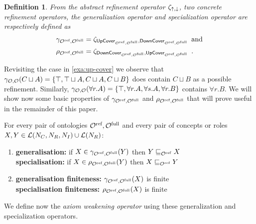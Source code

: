 \documentclass[
]{ceurart}
\newtheorem{definition}{Definition}
\begin{document}
\begin{definition}
  From the abstract refinement operator $\zeta_{\mathop{\uparrow},\mathop{\downarrow}}$, two concrete refinement operators, the \emph{generalization operator} and \emph{specialization operator} are respectively defined as
  \begin{align*}
    \gamma_{{\mathcal{O}^\textnormal{ref}},{\mathcal{O}^\textnormal{full}}} &= \zeta_{{\mathsf{UpCover}}_{{\mathcal{O}^\textnormal{ref}},{\mathcal{O}^\textnormal{full}}},{\mathsf{DownCover}}_{{\mathcal{O}^\textnormal{ref}},{\mathcal{O}^\textnormal{full}}}} \enspace \text{and} \\
    \rho_{{\mathcal{O}^\textnormal{ref}},{\mathcal{O}^\textnormal{full}}} &= \zeta_{{\mathsf{DownCover}}_{{\mathcal{O}^\textnormal{ref}},{\mathcal{O}^\textnormal{full}}},{\mathsf{UpCover}}_{{\mathcal{O}^\textnormal{ref}},{\mathcal{O}^\textnormal{full}}}} \enspace.
  \end{align*}
\end{definition}

Revisiting the case in \cref{exa:up-cover} we observe that $\gamma_{\mathcal{O},\mathcal{O}}(C \sqcup A) = \{ \top, \top \sqcup A, C \sqcup A, C \sqcup B \}$ does contain $C \sqcup B$ as a possible refinement. Similarly, $\gamma_{\mathcal{O},\mathcal{O}}(\forall r.A) = \{ \top, \forall r.A, \forall s.A, \forall r.B \}$ contains $\forall r.B$. We will show now some basic properties of $\gamma_{{\mathcal{O}^\textnormal{ref}},{\mathcal{O}^\textnormal{full}}}$ and $\rho_{{\mathcal{O}^\textnormal{ref}},{\mathcal{O}^\textnormal{full}}}$ that will prove useful in the remainder of this paper.

\begin{lemma}\label{lem:basic}
  For every pair of \SROIQ ontologies ${\mathcal{O}^\textnormal{ref}}, {\mathcal{O}^\textnormal{full}}$ and every pair of concepts or roles $X, Y \in \mathcal{L}(N_C, N_R, N_I) \cup \mathcal{L}(N_R)$:
  \newcommand\litem[1]{\item{\bfseries #1:\enspace }}
  \begin{enumerate}
    \litem{generalisation}\label{lem:generalisation} if $X \in \gamma_{{\mathcal{O}^\textnormal{ref}},{\mathcal{O}^\textnormal{full}}}(Y)$ then $Y \sqsubseteq_{{\mathcal{O}^\textnormal{ref}}} X$ \\
    \textbf{specialisation:\enspace} if $X \in \rho_{{\mathcal{O}^\textnormal{ref}},{\mathcal{O}^\textnormal{full}}}(Y)$ then $X \sqsubseteq_{{\mathcal{O}^\textnormal{ref}}} Y$
    \litem{generalisation finiteness} $\gamma_{{\mathcal{O}^\textnormal{ref}},{\mathcal{O}^\textnormal{full}}}(X)$ is finite \\
    \textbf{specialisation finiteness:\enspace} $\rho_{{\mathcal{O}^\textnormal{ref}},{\mathcal{O}^\textnormal{full}}}(X)$ is finite
  \end{enumerate}
\end{lemma}

We define now the \emph{axiom weakening operator} using these generalization and specialization operators.
\end{document}
